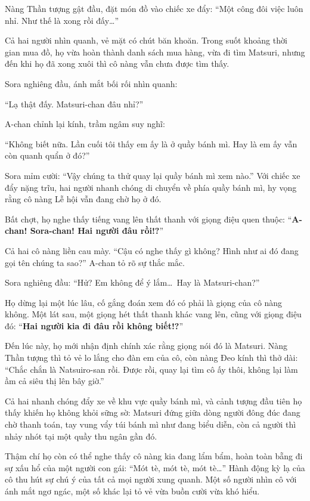 \documentclass[../main.tex]{subfiles}
\begin{document}
Nàng Thần tượng gật đầu, đặt món đồ vào chiếc xe đẩy: ``Một công đôi việc luôn nhỉ. Như thế là xong rồi đấy\dots''

Cả hai người nhìn quanh, vẻ mặt có chút băn khoăn. Trong suốt khoảng thời gian mua đồ, họ vừa hoàn thành danh sách mua hàng, vừa đi tìm Matsuri, nhưng đến khi họ đã xong xuôi thì cô nàng vẫn chưa được tìm thấy.

Sora nghiêng đầu, ánh mắt bối rối nhìn quanh:

``Lạ thật đấy. Matsuri-chan đâu nhỉ?''

A-chan chỉnh lại kính, trầm ngâm suy nghĩ:

``Không biết nữa. Lần cuối tôi thấy em ấy là ở quầy bánh mì. Hay là em ấy vẫn còn quanh quẩn ở đó?''

Sora mỉm cười: ``Vậy chúng ta thử quay lại quầy bánh mì xem nào.'' Với chiếc xe đẩy nặng trĩu, hai người nhanh chóng di chuyển về phía quầy bánh mì, hy vọng rằng cô nàng Lễ hội vẫn đang chờ họ ở đó.

Bất chợt, họ nghe thấy tiếng vang lên thất thanh với giọng điệu quen thuộc: ``\textbf{A-chan! Sora-chan! Hai người đâu rồi!?}''

Cả hai cô nàng liền cau mày. ``Cậu có nghe thấy gì không? Hình như ai đó đang gọi tên chúng ta sao?'' A-chan tỏ rõ sự thắc mắc.

Sora nghiêng đầu: ``Hử? Em không để ý lắm\dots\ Hay là Matsuri-chan?''

Họ dừng lại một lúc lâu, cố gắng đoán xem đó có phải là giọng của cô nàng không. Một lát sau, một giọng hét thất thanh khác vang lên, cũng với giọng điệu đó: ``\textbf{Hai người kia đi đâu rồi không biết!?}''

Đến lúc này, họ mới nhận định chính xác rằng giọng nói đó là Matsuri. Nàng Thần tượng thì tỏ vẻ lo lắng cho đàn em của cô, còn nàng Đeo kính thì thở dài: ``Chắc chắn là Natsuiro-san rồi. Được rồi, quay lại tìm cô ấy thôi, không lại làm ầm cả siêu thị lên bây giờ.''

Cả hai nhanh chóng đẩy xe về khu vực quầy bánh mì, và cảnh tượng đầu tiên họ thấy khiến họ không khỏi sững sờ: Matsuri đứng giữa dòng người đông đúc đang chờ thanh toán, tay vung vẩy túi bánh mì như đang biểu diễn, còn cả người thì nhảy nhót tại một quầy thu ngân gần đó.

Thậm chí họ còn có thể nghe thấy cô nàng kia đang lẩm bẩm, hoàn toàn bẵng đi sự xấu hổ của một người con gái: ``Mót tè, mót tè, mót tè\dots'' Hành động kỳ lạ của cô thu hút sự chú ý của tất cả mọi người xung quanh. Một số người nhìn cô với ánh mắt ngơ ngác, một số khác lại tỏ vẻ vừa buồn cười vừa khó hiểu.
\end{document}
